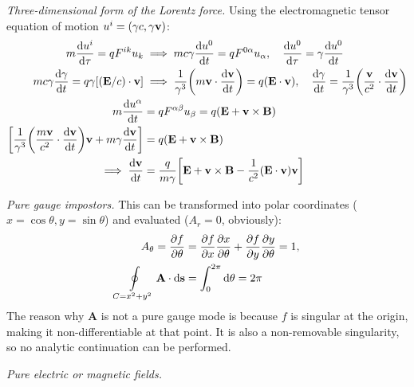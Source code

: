 \documentclass{report}
\begin{document}
\begin{subquests}
	\item \emph{Three-dimensional form of the Lorentz force.}
	Using the electromagnetic tensor equation of motion $u^i = (\gamma c, \gamma \vb v)$:
	\begin{align*}
		m\dv{u^i}{\tau} = q F^{ik}u_k & \implies mc\gamma\dv{u^0}{t} = q F^{0\alpha}u_{\alpha}, \quad \dv{u^0}{\tau} = \gamma \dv{u^0}{t} \\
		mc\gamma\dv{\gamma}{t} = q\gamma\bqty{(\mathbf E/c) \cdot \mathbf v} & \implies \frac{1}{\gamma^3}\pqty{m\mathbf v\cdot\dv{\mathbf v}{t}} = q\pqty{\mathbf E \cdot \mathbf v}, \quad \dv{\gamma}{t} = \frac{1}{\gamma^3}\pqty{\frac{\vb v}{c^2}\cdot \dv{\vb v}{t}}  \\
		m\dv{u^{\alpha}}{t} & = q F^{\alpha\beta}u_{\beta} = q\pqty{\mathbf E + \mathbf v \times \mathbf B} \\
		\bqty{\frac{1}{\gamma^3}\pqty{\frac{m\mathbf v}{c^2}\cdot \dv{\mathbf v}{t}}\vb v + m\gamma \dv{\mathbf v}{t}} & = q\pqty{\mathbf E + \mathbf v \times \mathbf B} \\
		\implies \dv{\mathbf v}{t} & = \frac{q}{m\gamma}\bqty{\mathbf E + \mathbf v \times \mathbf B - \frac{1}{c^2}\pqty{\mathbf E \cdot \mathbf v}\mathbf v}
	\end{align*}

	\item \emph{Pure gauge impostors.}
	This can be transformed into polar coordinates ($x = \cos\theta, y = \sin\theta $) and evaluated ($A_r = 0$, obviously):
	\begin{align*}
		A_{\theta} = \pdv{f}{\theta} & = \pdv{f}{x}\pdv{x}{\theta} + \pdv{f}{y}\pdv{y}{\theta} = 1,\\
		\oint\limits_{C = x^2 + y^2} \mathbf A \cdot \dd{\mathbf s} & = \int_0^{2\pi}\dd{\theta} = 2\pi 
	\end{align*}
	The reason why $\mathbf A$ is not a pure gauge mode is because $f$ is singular at the origin, making it non-differentiable at that point. It is also a non-removable singularity, so no analytic continuation can be performed.

	\item \emph{Pure electric or magnetic fields.}


\end{subquests}
\end{document}
